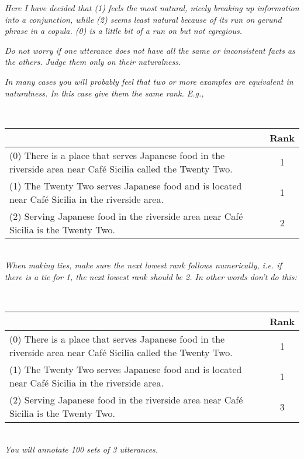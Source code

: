   \textit{  Here I have decided that (1) feels the most natural, nicely breaking up information into a conjunction, while (2) seems least natural because of its run on gerund phrase in a  copula. (0) is a little bit of a run on but not egregious.}

 \textit{   Do not worry if one utterance does not have all the same or inconsistent facts as the others. Judge them only on their naturalness.}


  \textit{  In many cases you will probably feel that two or more examples are equivalent in naturalness. In this case give them the same rank. E.g.,}


~\\

\begin{centering}

\begin{tabular}{p{5.5cm} c}
\toprule
   &  Rank\\
   \midrule
        (0) There is a place that serves Japanese food in the riverside area near Caf{\'e} Sicilia called the Twenty Two. &   1 \\
   \midrule
        (1) The Twenty Two serves Japanese food and is located near Caf{\'e} Sicilia in the riverside area. &  1 \\
   \midrule
        (2) Serving Japanese food in the riverside area near Caf{\'e} Sicilia is the Twenty Two.  &  2 \\
\bottomrule
\end{tabular}

\end{centering}

~\\


\textit{When making ties, make sure the next lowest rank follows numerically, i.e. if there is a tie for 1, the next lowest rank should be 2. In other words don't do this:}

~\\

\begin{centering}

\begin{tabular}{p{5.5cm} c}
\toprule
   &  Rank\\
   \midrule
            (0) There is a place that serves Japanese food in the riverside area near Caf{\'e} Sicilia called the Twenty Two.  &  1\\
      (1) The Twenty Two serves Japanese food and is located near Caf{\'e} Sicilia in the riverside area. &  1 \\
          (2) Serving Japanese food in the riverside area near Caf{\'e} Sicilia is the Twenty Two.  &  3 \\
\bottomrule
\end{tabular}

\end{centering}

~\\

        \textit{    You will annotate 100 sets of 3 utterances.}



